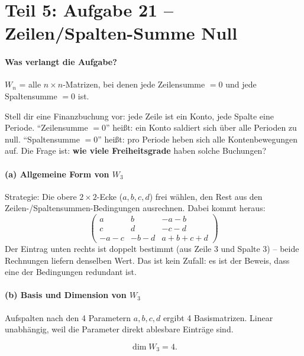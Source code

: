 \documentclass[a4paper,12pt]{article}
\begin{document}
\newpage

\part*{Teil 5: Aufgabe 21 -- Zeilen/Spalten-Summe Null}

\subsection*{Was verlangt die Aufgabe?}

$W_n$ = alle $n \times n$-Matrizen, bei denen jede Zeilensumme $= 0$ und jede Spaltensumme $= 0$ ist.

\begin{analogie}
Stell dir eine Finanzbuchung vor: jede Zeile ist ein Konto, jede Spalte eine Periode. ``Zeilensumme $= 0$'' hei\ss t: ein Konto saldiert sich \"uber alle Perioden zu null. ``Spaltensumme $= 0$'' hei\ss t: pro Periode heben sich alle Kontenbewegungen auf. Die Frage ist: \textbf{wie viele Freiheitsgrade} haben solche Buchungen?
\end{analogie}

\subsection*{(a) Allgemeine Form von $W_3$}

Strategie: Die obere $2 \times 2$-Ecke ($a, b, c, d$) frei w\"ahlen, den Rest aus den Zeilen-/Spaltensummen-Bedingungen ausrechnen. Dabei kommt heraus:
\[
\begin{pmatrix} a & b & -a-b \\ c & d & -c-d \\ -a-c & -b-d & a+b+c+d \end{pmatrix}
\]
Der Eintrag unten rechts ist doppelt bestimmt (aus Zeile 3 und Spalte 3) -- beide Rechnungen liefern denselben Wert. Das ist kein Zufall: es ist der Beweis, dass eine der Bedingungen redundant ist.

\subsection*{(b) Basis und Dimension von $W_3$}

Aufspalten nach den 4 Parametern $a, b, c, d$ ergibt 4 Basismatrizen. Linear unabh\"angig, weil die Parameter direkt ablesbare Eintr\"age sind.

\[
\dim W_3 = 4.
\]
\end{document}
